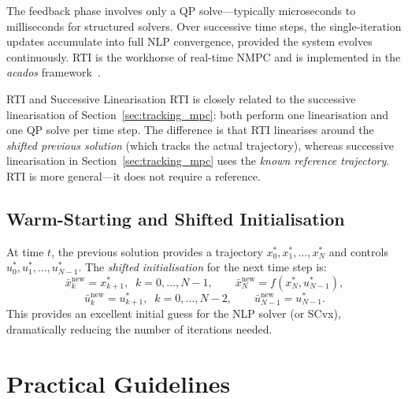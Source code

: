 The feedback phase involves only a QP solve---typically microseconds to milliseconds for structured solvers. Over successive time steps, the single-iteration updates accumulate into full NLP convergence, provided the system evolves continuously. RTI is the workhorse of real-time NMPC and is implemented in the \emph{acados} framework~\cite{Verschueren2022}.

\begin{notebox}{RTI and Successive Linearisation}
	RTI is closely related to the successive linearisation of Section~\ref{sec:tracking_mpc}: both perform one linearisation and one QP solve per time step. The difference is that RTI linearises around the \emph{shifted previous solution} (which tracks the actual trajectory), whereas successive linearisation in Section~\ref{sec:tracking_mpc} uses the \emph{known reference trajectory}. RTI is more general---it does not require a reference.
\end{notebox}

\subsection{Warm-Starting and Shifted Initialisation}

At time $t$, the previous solution provides a trajectory $x_0^*, x_1^*, \dots, x_N^*$ and controls $u_0^*, u_1^*, \dots, u_{N-1}^*$. The \emph{shifted initialisation} for the next time step is:
\[
\bar{x}_k^{\text{new}} = x_{k+1}^*, \;\; k = 0, \dots, N{-}1, \qquad \bar{x}_N^{\text{new}} = f(x_N^*, u_{N-1}^*),
\]
\[
\bar{u}_k^{\text{new}} = u_{k+1}^*, \;\; k = 0, \dots, N{-}2, \qquad \bar{u}_{N-1}^{\text{new}} = u_{N-1}^*.
\]
This provides an excellent initial guess for the NLP solver (or SCvx), dramatically reducing the number of iterations needed.


\section{Practical Guidelines}
\label{sec:nmpc_guidelines}

